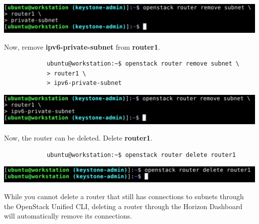 \documentclass[letterpaper, 12pt]{article}
\begin{document}
\begin{enumerate}
\begin{labstep}
        \begin{center}
            \includegraphics[width=\linewidth]{images/part1/step7.png}
        \end{center}
    \end{labstep}

    \begin{labstep}
        Now, remove \textbf{ipv6-private-subnet} from \textbf{router1}.
        \begin{lstlisting}
            ubuntu@workstation:~$ openstack router remove subnet \
            > router1 \
            > ipv6-private-subnet
        \end{lstlisting}

        \begin{center}
            \includegraphics[width=\linewidth]{images/part1/step8.png}
        \end{center}
    \end{labstep}

    \begin{labstep}
        Now, the router can be deleted.
        Delete \textbf{router1}.
        \begin{lstlisting}
            ubuntu@workstation:~$ openstack router delete router1
        \end{lstlisting}

        \begin{center}
            \includegraphics[width=\linewidth]{images/part1/step9.png}
        \end{center}
    \end{labstep}

    \begin{tipbox}
        While you cannot delete a router that still has connections to subnets through the OpenStack Unified CLI, deleting a router through the Horizon Dashboard will automatically remove its connections.
    \end{tipbox}


\end{enumerate}
\end{document}

